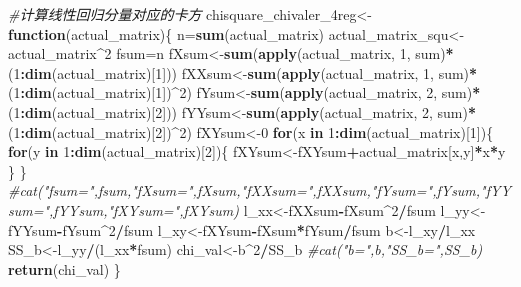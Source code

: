 \documentclass[
]{article}
\newenvironment{Shaded}{\begin{snugshade}}{\end{snugshade}}
\newcommand{\CommentTok}[1]{\textcolor[rgb]{0.56,0.35,0.01}{\textit{#1}}}
\newcommand{\ControlFlowTok}[1]{\textcolor[rgb]{0.13,0.29,0.53}{\textbf{#1}}}
\newcommand{\DecValTok}[1]{\textcolor[rgb]{0.00,0.00,0.81}{#1}}
\newcommand{\KeywordTok}[1]{\textcolor[rgb]{0.13,0.29,0.53}{\textbf{#1}}}
\newcommand{\NormalTok}[1]{#1}
\newcommand{\OperatorTok}[1]{\textcolor[rgb]{0.81,0.36,0.00}{\textbf{#1}}}
\begin{document}
\begin{Shaded}
\begin{Highlighting}[]
\CommentTok{#计算线性回归分量对应的卡方}
\NormalTok{chisquare_chivaler_4reg<-}\ControlFlowTok{function}\NormalTok{(actual_matrix)\{}
\NormalTok{     n=}\KeywordTok{sum}\NormalTok{(actual_matrix)}
\NormalTok{     actual_matrix_squ<-actual_matrix}\OperatorTok{^}\DecValTok{2}
\NormalTok{     fsum=n}
\NormalTok{     fXsum<-}\KeywordTok{sum}\NormalTok{(}\KeywordTok{apply}\NormalTok{(actual_matrix, }\DecValTok{1}\NormalTok{, sum)}\OperatorTok{*}\NormalTok{(}\DecValTok{1}\OperatorTok{:}\KeywordTok{dim}\NormalTok{(actual_matrix)[}\DecValTok{1}\NormalTok{]))}
\NormalTok{     fXXsum<-}\KeywordTok{sum}\NormalTok{(}\KeywordTok{apply}\NormalTok{(actual_matrix, }\DecValTok{1}\NormalTok{, sum)}\OperatorTok{*}\NormalTok{(}\DecValTok{1}\OperatorTok{:}\KeywordTok{dim}\NormalTok{(actual_matrix)[}\DecValTok{1}\NormalTok{])}\OperatorTok{^}\DecValTok{2}\NormalTok{)}
\NormalTok{     fYsum<-}\KeywordTok{sum}\NormalTok{(}\KeywordTok{apply}\NormalTok{(actual_matrix, }\DecValTok{2}\NormalTok{, sum)}\OperatorTok{*}\NormalTok{(}\DecValTok{1}\OperatorTok{:}\KeywordTok{dim}\NormalTok{(actual_matrix)[}\DecValTok{2}\NormalTok{]))}
\NormalTok{     fYYsum<-}\KeywordTok{sum}\NormalTok{(}\KeywordTok{apply}\NormalTok{(actual_matrix, }\DecValTok{2}\NormalTok{, sum)}\OperatorTok{*}\NormalTok{(}\DecValTok{1}\OperatorTok{:}\KeywordTok{dim}\NormalTok{(actual_matrix)[}\DecValTok{2}\NormalTok{])}\OperatorTok{^}\DecValTok{2}\NormalTok{)}
\NormalTok{     fXYsum<-}\DecValTok{0}
     \ControlFlowTok{for}\NormalTok{(x }\ControlFlowTok{in} \DecValTok{1}\OperatorTok{:}\KeywordTok{dim}\NormalTok{(actual_matrix)[}\DecValTok{1}\NormalTok{])\{}
          \ControlFlowTok{for}\NormalTok{(y }\ControlFlowTok{in} \DecValTok{1}\OperatorTok{:}\KeywordTok{dim}\NormalTok{(actual_matrix)[}\DecValTok{2}\NormalTok{])\{}
\NormalTok{               fXYsum<-fXYsum}\OperatorTok{+}\NormalTok{actual_matrix[x,y]}\OperatorTok{*}\NormalTok{x}\OperatorTok{*}\NormalTok{y}
\NormalTok{          \}}
\NormalTok{     \}}
     \CommentTok{#cat("fsum=",fsum,"fXsum=",fXsum,"fXXsum=",fXXsum,"fYsum=",fYsum,"fYYsum=",fYYsum,"fXYsum=",fXYsum)}
\NormalTok{     l_xx<-fXXsum}\OperatorTok{-}\NormalTok{fXsum}\OperatorTok{^}\DecValTok{2}\OperatorTok{/}\NormalTok{fsum}
\NormalTok{     l_yy<-fYYsum}\OperatorTok{-}\NormalTok{fYsum}\OperatorTok{^}\DecValTok{2}\OperatorTok{/}\NormalTok{fsum}
\NormalTok{     l_xy<-fXYsum}\OperatorTok{-}\NormalTok{fXsum}\OperatorTok{*}\NormalTok{fYsum}\OperatorTok{/}\NormalTok{fsum}
\NormalTok{     b<-l_xy}\OperatorTok{/}\NormalTok{l_xx}
\NormalTok{     SS_b<-l_yy}\OperatorTok{/}\NormalTok{(l_xx}\OperatorTok{*}\NormalTok{fsum)}
\NormalTok{     chi_val<-b}\OperatorTok{^}\DecValTok{2}\OperatorTok{/}\NormalTok{SS_b}
     \CommentTok{#cat("b=",b,"SS_b=",SS_b)}
     \KeywordTok{return}\NormalTok{(chi_val)}
\NormalTok{\}}


\end{Highlighting}
\end{Shaded}
\end{document}

